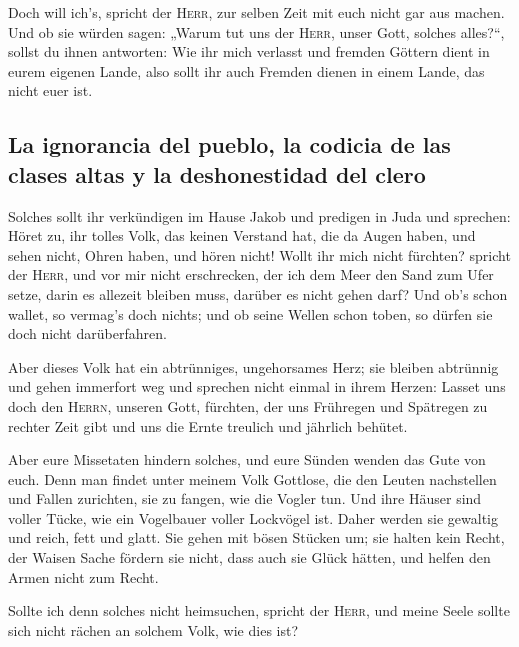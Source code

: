 Doch will ich's, spricht der \textsc{Herr}, zur selben
Zeit mit euch nicht gar aus machen.  Und ob sie würden
sagen: „Warum tut uns der \textsc{Herr}, unser Gott, solches alles?{}``,
sollst du ihnen antworten: Wie ihr mich verlasst und fremden Göttern
dient in eurem eigenen Lande, also sollt ihr auch Fremden dienen in
einem Lande, das nicht euer ist.

\hypertarget{la-ignorancia-del-pueblo-la-codicia-de-las-clases-altas-y-la-deshonestidad-del-clero}{%
\subsection{La ignorancia del pueblo, la codicia de las clases altas y
la deshonestidad del
clero}\label{la-ignorancia-del-pueblo-la-codicia-de-las-clases-altas-y-la-deshonestidad-del-clero}}

 Solches sollt ihr verkündigen im Hause Jakob und
predigen in Juda und sprechen:  Höret zu, ihr tolles
Volk, das keinen Verstand hat, die da Augen haben, und sehen nicht,
Ohren haben, und hören nicht!  Wollt ihr mich nicht
fürchten? spricht der \textsc{Herr}, und vor mir nicht erschrecken, der
ich dem Meer den Sand zum Ufer setze, darin es allezeit bleiben muss,
darüber es nicht gehen darf? Und ob's schon wallet, so vermag's doch
nichts; und ob seine Wellen schon toben, so dürfen sie doch nicht
darüberfahren.

 Aber dieses Volk hat ein abtrünniges, ungehorsames Herz;
sie bleiben abtrünnig und gehen immerfort weg  und
sprechen nicht einmal in ihrem Herzen: Lasset uns doch den
\textsc{Herrn}, unseren Gott, fürchten, der uns Frühregen und Spätregen
zu rechter Zeit gibt und uns die Ernte treulich und jährlich behütet.

 Aber eure Missetaten hindern solches, und eure Sünden
wenden das Gute von euch.  Denn man findet unter meinem
Volk Gottlose, die den Leuten nachstellen und Fallen zurichten, sie zu
fangen, wie die Vogler tun.  Und ihre Häuser sind voller
Tücke, wie ein Vogelbauer voller Lockvögel ist. Daher werden sie
gewaltig und reich, fett und glatt.  Sie gehen mit bösen
Stücken um; sie halten kein Recht, der Waisen Sache fördern sie nicht,
dass auch sie Glück hätten, und helfen den Armen nicht zum Recht.

 Sollte ich denn solches nicht heimsuchen, spricht der
\textsc{Herr}, und meine Seele sollte sich nicht rächen an solchem Volk,
wie dies ist?

